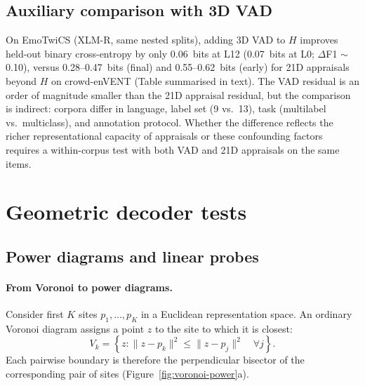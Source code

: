 \documentclass[11pt]{article}
\begin{document}
\subsection{Auxiliary comparison with 3D VAD}
\label{sec:vad}

On EmoTwiCS (XLM-R, same nested splits), adding 3D VAD to $H$ improves held-out binary cross-entropy by only $0.06$~bits at L12 (0.07~bits at L0; $\Delta$F1 $\sim$0.10), versus 0.28--0.47~bits (final) and 0.55--0.62~bits (early) for 21D appraisals beyond $H$ on crowd-enVENT (Table summarised in text). The VAD residual is an order of magnitude smaller than the 21D appraisal residual, but the comparison is indirect: corpora differ in language, label set (9 vs.\ 13), task (multilabel vs.\ multiclass), and annotation protocol. Whether the difference reflects the richer representational capacity of appraisals or these confounding factors requires a within-corpus test with both VAD and 21D appraisals on the same items.

\section{Geometric decoder tests}
\label{sec:ladder}

\subsection{Power diagrams and linear probes}

\paragraph{From Voronoi to power diagrams.}
Consider first $K$ sites $p_1,\ldots,p_K$ in a Euclidean representation space. An ordinary Voronoi diagram assigns a point $z$ to the site to which it is closest:
\begin{equation}
V_k=\left\{z:\|z-p_k\|^2\leq\|z-p_j\|^2\quad\forall j\right\}. \label{eq:vorcell}
\end{equation}
Each pairwise boundary is therefore the perpendicular bisector of the corresponding pair of sites (Figure~\ref{fig:voronoi-power}a).
\end{document}
